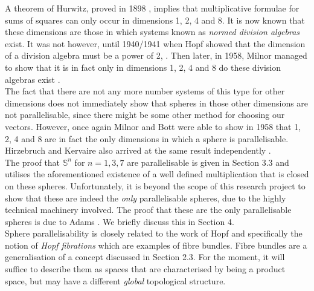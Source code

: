A theorem of Hurwitz, proved in 1898 \cite{Hurwitz1898,Hurwitz1923}, implies that multiplicative formulae for sums of squares can only occur in dimensions 1, 2, 4 and 8. It is now known that these dimensions are those in which systems known as \textit{normed division algebras} exist. It was not however, until 1940/1941 when Hopf showed that the dimension of a division algebra must be a power of 2, \cite{MR0004785}. Then later, in 1958, Milnor managed to show that it is in fact only in dimensions 1, 2, 4 and 8 do these division algebras exist \cite{MR0102805}.\\

The fact that there are not any more number systems of this type for other dimensions does not immediately show that spheres in those other dimensions are not parallelisable, since there might be some other method for choosing our vectors. However, once again Milnor and Bott \cite{MR0102804} were able to show in 1958 that 1, 2, 4 and 8 are in fact the only dimensions in which a sphere is parallelisable. Hirzebruch and Kervaire also arrived at the same result independently \cite{MR1415833,MR3075371,atiyah1961bott}.\\

The proof that $\mathbb{S}^n$ for $n=1,3,7$ are parallelisable is given in Section 3.3 and utilises the aforementioned existence of a well defined multiplication that is closed on these spheres. Unfortunately, it is beyond the scope of this research project to show that these are indeed the \textit{only} parallelisable spheres, due to the highly technical machinery involved. The proof that these are the only parallelisable spheres is due to Adams \cite{MR0141119}. We briefly discuss this in Section 4.\\

Sphere parallelisability is closely related to the work of Hopf and specifically the notion of \textit{Hopf fibrations} which are examples of fibre bundles. Fibre bundles are a generalisation of a concept discussed in Section 2.3. For the moment, it will suffice to describe them as spaces that are characterised by being  a product space, but may have a different \textit{global} topological structure. \\


